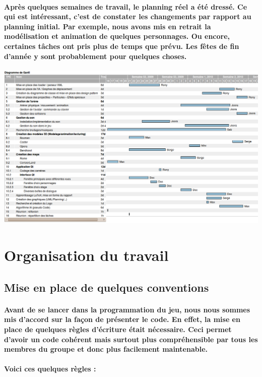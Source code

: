 \paragraph{Après quelques semaines de travail, le planning réel a été dressé. Ce qui est intéressant, c'est de constater les changements par rapport au planning initial. Par exemple, nous avons mis en retrait la modélisation et animation de quelques personnages. Ou encore, certaines t\^aches ont pris plus de temps que prévu. Les f\^etes de fin d'année y sont probablement pour quelques choses.}

\hspace{-1cm}
\includegraphics[scale=0.4]{visuel/planning-reel.png}
\hspace{0cm}

\newpage
\section{Organisation du travail}
\subsection{Mise en place de quelques conventions}
\vspace{0.5cm}

\paragraph{Avant de se lancer dans la programmation du jeu, nous nous sommes mis d'accord sur la façon de présenter le code. En effet, la mise en place de quelques règles d'écriture était nécessaire. Ceci permet d'avoir un code cohérent mais surtout plus compréhensible par tous les membres du groupe et donc plus facilement maintenable.}
\paragraph{Voici ces quelques règles :}

